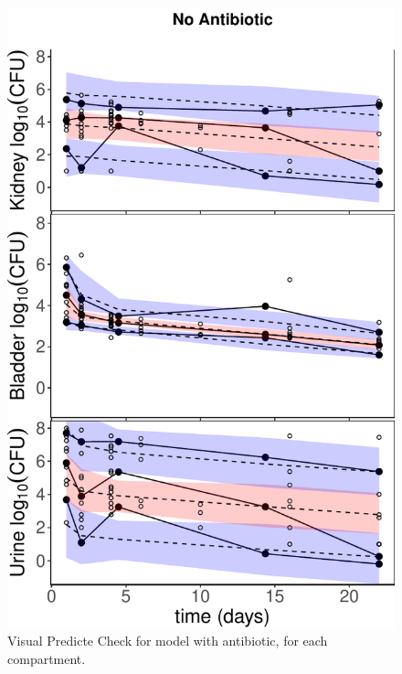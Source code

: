 \documentclass{article}
\begin{document}
\begin{figure}
	\centering
	\includegraphics[width=\linewidth]{images/plt_vpc_merged_Ct_ONLY.pdf}
	\caption{Visual Predicte Check for model with antibiotic, for each compartment.}
\end{figure}
\end{document}
